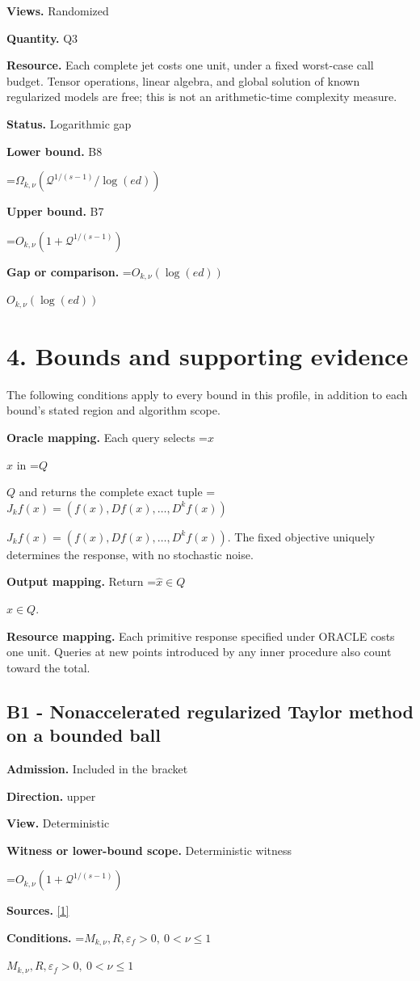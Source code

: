 \documentclass[10pt,a4paper]{article}
\newcommand{\AtlasMath}[1]{\par\begingroup\centering\setbox0=\hbox{$\displaystyle #1$}\ifdim\wd0>1.4\linewidth\typeout{ATLAS WIDE FORMULA: \the\wd0}\fi\ifdim\wd0>\linewidth\resizebox{\linewidth}{!}{\box0}\else\box0\fi\par\endgroup}
\newcommand{\AtlasInlineMath}[1]{\begingroup\setbox0=\hbox{$#1$}\ifdim\wd0>.4\linewidth\endgroup\AtlasMath{#1}\else\endgroup$#1$\fi}
\begin{document}
\textbf{Views.} Randomized

\textbf{Quantity.} Q3

\textbf{Resource.} Each complete jet costs one unit, under a fixed worst-case call budget. Tensor operations, linear algebra, and global solution of known regularized models are free; this is not an arithmetic-time complexity measure.

\textbf{Status.} Logarithmic gap

\textbf{Lower bound.} B8

\AtlasMath{\Omega_{k,\nu}(\mathcal{Q}^{1/(s-1)}/\log(ed))}
\textbf{Upper bound.} B7

\AtlasMath{O_{k,\nu}(1+\mathcal{Q}^{1/(s-1)})}
\textbf{Gap or comparison.} \AtlasInlineMath{O_{k,\nu}(\log(ed))}

\section{4. Bounds and supporting evidence}
The following conditions apply to every bound in this profile, in addition to each bound's stated region and algorithm scope.

\textbf{Oracle mapping.} Each query selects \AtlasInlineMath{x} in \AtlasInlineMath{Q} and returns the complete exact tuple \AtlasInlineMath{J_{k}f(x)=(f(x),Df(x),\ldots,D^{k}f(x))}. The fixed objective uniquely determines the response, with no stochastic noise.

\textbf{Output mapping.} Return \AtlasInlineMath{\widehat{x}\in Q}.

\textbf{Resource mapping.} Each primitive response specified under ORACLE costs one unit. Queries at new points introduced by any inner procedure also count toward the total.

\subsection{B1 - Nonaccelerated regularized Taylor method on a bounded ball}
\textbf{Admission.} Included in the bracket

\textbf{Direction.} upper

\textbf{View.} Deterministic

\textbf{Witness or lower-bound scope.} Deterministic witness

\AtlasMath{O_{k,\nu}(1+\mathcal{Q}^{1/(s-1)})}
\textbf{Sources.} \href{https://arxiv.org/pdf/2411.08987v2}{[1]}

\textbf{Conditions.} \AtlasInlineMath{M_{k,\nu},R,\varepsilon_f>0,\ 0<\nu\le1}
\end{document}
